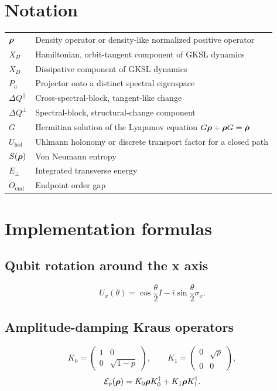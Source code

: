 \appendix
\section{Notation}

\begin{longtable}{p{} p{}}
\toprule
$\bm{\rho}$ & Density operator or density-like normalized positive operator \\
$X_H$ & Hamiltonian, orbit-tangent component of GKSL dynamics \\
$X_D$ & Dissipative component of GKSL dynamics \\
$P_a$ & Projector onto a distinct spectral eigenspace \\
$\Delta Q^{\parallel}$ & Cross-spectral-block, tangent-like change \\
$\Delta Q^{\perp}$ & Spectral-block, structural-change component \\
$G$ & Hermitian solution of the Lyapunov equation $G\bm{\rho}+\bm{\rho} G=\dot{\bm{\rho}}$ \\
$U_{\mathrm{hol}}$ & Uhlmann holonomy or discrete transport factor for a closed path \\
$S(\bm{\rho})$ & Von Neumann entropy \\
$E_\perp$ & Integrated transverse energy \\
$O_{\mathrm{end}}$ & Endpoint order gap \\
\bottomrule
\end{longtable}

\section{Implementation formulas}

\subsection{Qubit rotation around the x axis}

\[
U_x(\theta)=\cos\frac\theta2 I-i\sin\frac\theta2\sigma_x.
\]

\subsection{Amplitude-damping Kraus operators}

\[
K_0=\begin{pmatrix}1&0\\0&\sqrt{1-p}\end{pmatrix},\qquad
K_1=\begin{pmatrix}0&\sqrt p\\0&0\end{pmatrix},
\]
\[
\mathcal E_p(\bm{\rho})=K_0\bm{\rho} K_0^\dagger+K_1\bm{\rho} K_1^\dagger.
\]

